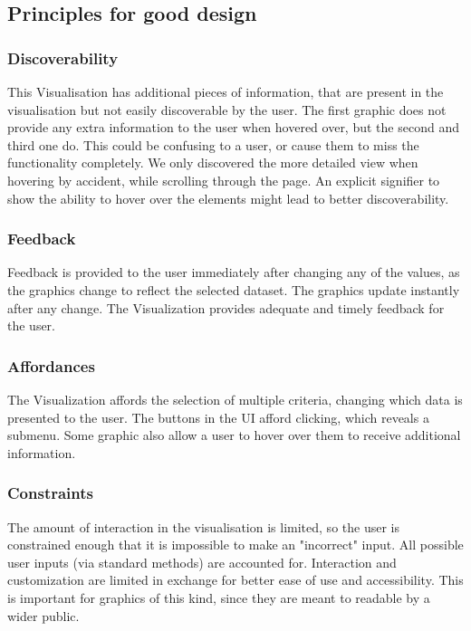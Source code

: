 \documentclass[12pt, letterpaper]{article}
\begin{document}
\subsection{Principles for good design}
\subsubsection{Discoverability}
This Visualisation has additional pieces of information, that are present in the visualisation but not easily discoverable by the user. The first graphic does not provide any extra information to the user when hovered over, but the second and third one do. This could be confusing to a user, or cause them to miss the functionality completely. We only discovered the more detailed view when hovering by accident, while scrolling through the page. An explicit signifier to show the ability to hover over the elements might lead to better discoverability.

\subsubsection{Feedback}
Feedback is provided to the user immediately after changing any of the values, as the graphics change to reflect the selected dataset. The graphics update instantly after any change. The Visualization provides adequate and timely feedback for the user.

\subsubsection{Affordances}
The Visualization affords the selection of multiple criteria, changing which data is presented to the user. The buttons in the UI afford clicking, which reveals a submenu. Some graphic also allow a user to hover over them to receive additional information.


\subsubsection{Constraints}
The amount of interaction in the visualisation is limited, so the user is constrained enough that it is impossible to make an "incorrect" input. All possible user inputs (via standard methods) are accounted for. Interaction and customization are limited in exchange for better ease of use and accessibility. This is important for graphics of this kind, since they are meant to readable by a wider public.
\newpage
\end{document}
